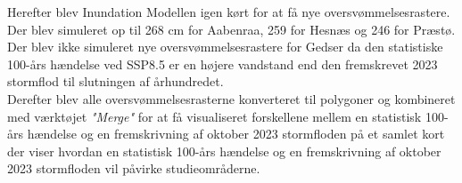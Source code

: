 Herefter blev Inundation Modellen igen kørt for at få nye oversvømmelsesrastere. Der blev simuleret op til 268 cm for Aabenraa, 259 for Hesnæs og 246 for Præstø. Der blev ikke simuleret nye oversvømmelsesrastere for Gedser da den statistiske 100-års hændelse ved SSP8.5 er en højere vandstand end den fremskrevet 2023 stormflod til slutningen af århundredet. \\


Derefter blev alle oversvømmelsesrasterne konverteret til polygoner og kombineret med værktøjet \textit{"Merge"} for at få visualiseret forskellene mellem en statistisk 100-års hændelse og en fremskrivning af oktober 2023 stormfloden på et samlet kort der viser hvordan en statistisk 100-års hændelse og en fremskrivning af oktober 2023 stormfloden vil påvirke studieområderne.